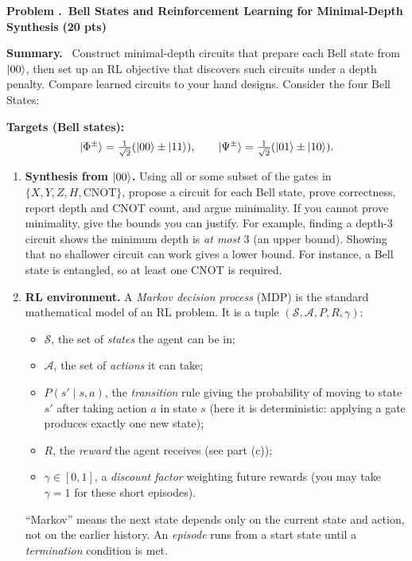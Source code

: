 \documentclass[11pt]{article}
\newcommand{\pts}[1]{\hfill{\small\bfseries(#1 pts)}}
\newenvironment{summary}{\vspace{2pt}\noindent\textbf{Summary.}~}{\par\vspace{6pt}}
\newcounter{problem}
\newcommand{\problem}[2]{%
  \refstepcounter{problem}
  \vspace{10pt}\noindent\textbf{Problem \theproblem.~#1} \pts{#2}\par
}
\begin{document}
\problem{Bell States and Reinforcement Learning for Minimal-Depth Synthesis}{20}
\begin{summary}
Construct minimal-depth circuits that prepare each Bell state from $\ket{00}$, then set up an RL objective that discovers such circuits under a depth penalty. Compare learned circuits to your hand designs. Consider the four Bell States:
\end{summary}

\textbf{Targets (Bell states):}
\[
\ket{\Phi^\pm}=\tfrac{1}{\sqrt{2}}(\ket{00}\pm\ket{11}),\qquad
\ket{\Psi^\pm}=\tfrac{1}{\sqrt{2}}(\ket{01}\pm\ket{10}).
\]

\begin{enumerate}[label=(\alph*)]
  \item \textbf{Synthesis from $\ket{00}$.} Using all or some subset of the gates in $\{X,Y,Z,H,\mathrm{CNOT}\}$, propose a circuit for each Bell state, prove correctness, report depth and CNOT count, and argue minimality. If you cannot prove minimality, give the bounds you can justify. For example, finding a depth-3 circuit shows the minimum depth is \emph{at most} 3 (an upper bound). Showing that no shallower circuit can work gives a lower bound. For instance, a Bell state is entangled, so at least one CNOT is required.
  \item \textbf{RL environment.} A \emph{Markov decision process} (MDP) is the standard mathematical model of an RL problem. It is a tuple $(\mathcal{S},\mathcal{A},P,R,\gamma)$:
  \begin{itemize}
    \item $\mathcal{S}$, the set of \emph{states} the agent can be in;
    \item $\mathcal{A}$, the set of \emph{actions} it can take;
    \item $P(s'\mid s,a)$, the \emph{transition} rule giving the probability of moving to state $s'$ after taking action $a$ in state $s$ (here it is deterministic: applying a gate produces exactly one new state);
    \item $R$, the \emph{reward} the agent receives (see part (c));
    \item $\gamma\in[0,1]$, a \emph{discount factor} weighting future rewards (you may take $\gamma=1$ for these short episodes).
  \end{itemize}
  ``Markov'' means the next state depends only on the current state and action, not on the earlier history. An \emph{episode} runs from a start state until a \emph{termination} condition is met.

\end{enumerate}
\end{document}
